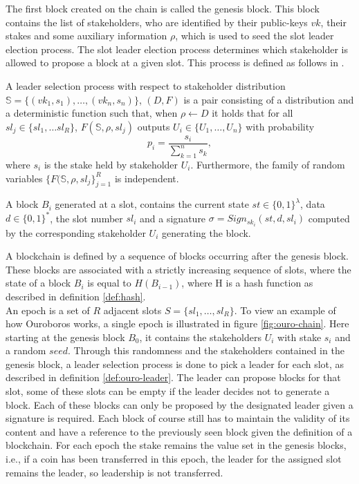 The first block created on the chain is called the genesis block. This block contains the list of stakeholders, who are identified by their public-keys $vk$, their stakes and some auxiliary information $\rho$, which is used to seed the slot leader election process. The slot leader election process determines which stakeholder is allowed to propose a block at a given slot. This process is defined as follows in \cite{ouroboros}.

\begin{mydef}
\label{def:ouro-leader}
A leader selection process with respect to stakeholder distribution $\mathbb{S} = \{(vk_1, s_1), \ldots, (vk_n, s_n)\}$, $(D,F)$ is a pair consisting of a distribution and a deterministic function such that, when $\rho \xleftarrow{} D$ it holds that for all $sl_j \in \{sl_1, \ldots sl_R\}$, $F(\mathbb{S},\rho,sl_j)$ outputs $U_i \in \{U_1,\ldots, U_n\}$ with probability
\begin{equation*}
    p_i = \frac{s_i}{\sum_{k=1}^n s_k},
\end{equation*}
where $s_i$ is the stake held by stakeholder $U_i$. Furthermore, the family of random variables $\{ F(\mathbb{S}, \rho, sl_j \}_{j=1}^R$ is independent.
\end{mydef}

A block $B_i$ generated at a slot, contains the current state $st \in \{0,1\}^{\lambda}$, data $d \in \{0,1\}^*$, the slot number $sl_i$ and a signature $\sigma = Sign_{sk_i}(st,d,sl_i)$ computed by the corresponding stakeholder $U_i$ generating the block.

A blockchain is defined by a sequence of blocks occurring after the genesis block. These blocks are associated with a strictly increasing sequence of slots, where the state of a block $B_i$ is equal to $H(B_{i-1})$, where H is a hash function as described in definition \ref{def:hash}.\\

An epoch is a set of $R$ adjacent slots $S = \{sl_1, \dots, sl_R\}$. To view an example of how Ouroboros works, a single epoch is illustrated in figure \ref{fig:ouro-chain}. Here starting at the genesis block $B_0$, it contains the stakeholders $U_i$ with stake $s_i$ and a random $seed$. Through this randomness and the stakeholders contained in the genesis block, a leader selection process is done to pick a leader for each slot, as described in definition \ref{def:ouro-leader}. The leader can propose blocks for that slot, some of these slots can be empty if the leader decides not to generate a block. Each of these blocks can only be proposed by the designated leader given a signature is required. Each block of course still has to maintain the validity of its content and have a reference to the previously seen block given the definition of a blockchain. For each epoch the stake remains the value set in the genesis blocks, i.e., if a coin has been transferred in this epoch, the leader for the assigned slot remains the leader, so leadership is not transferred.

